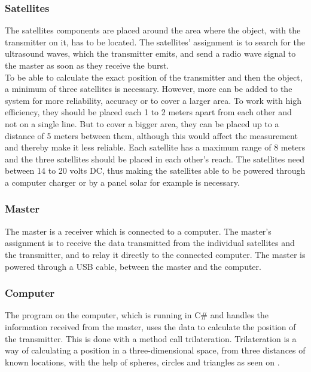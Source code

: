 \subsubsection{Satellites}
The satellites components are placed around the area where the object, with the transmitter on it, has to be located. The satellites' assignment is to search for the ultrasound waves, which the transmitter emits, and send a radio wave signal to the master as soon as they receive the burst.\\
To be able to calculate the exact position of the transmitter and then the object, a minimum of three satellites is necessary. However, more can be added to the system for more reliability, accuracy or to cover a larger area. To work with high efficiency, they should be placed each 1 to 2 meters apart from each other and not on a single line. But to cover a bigger area, they can be placed up to a distance of 5 meters between them, although this would affect the measurement and thereby make it less reliable. Each satellite has a maximum range of 8 meters and the three satellites should be placed in each other's reach. The satellites need between 14 to 20 volts DC, thus making the satellites able to be powered through a computer charger or by a panel solar for example is necessary.

\subsubsection{Master}
The master is a receiver which is connected to a computer. The master's assignment is to receive the data transmitted from the individual satellites and the transmitter, and to relay it directly to the connected computer. The master is powered through a USB cable, between the master and the computer.\\

\subsubsection{Computer}
The program on the computer, which is running in C\# and handles the information received from the master, uses the data to calculate the position of the transmitter. This is done with a method call trilateration. Trilateration is a way of calculating a position in a three-dimensional space, from three distances of known locations, with the help of spheres, circles and triangles as seen on .

